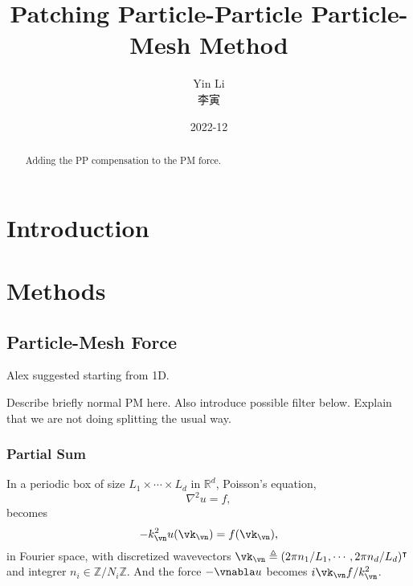 \documentclass[a4paper]{article}
\newcommand{\gkai}[1]{\begin{CJK*}{UTF8}{gkai}\raisebox{.1em}{(}#1\raisebox{.1em}{)}\end{CJK*}}
\newcommand{\YL}[1]{\textcolor{Bittersweet}{#1}}
\begin{document}
\title{Patching Particle-Particle Particle-Mesh Method}


\author{Yin Li \gkai{李寅}}


\date{2022-12}


\maketitle



\begin{abstract}
Adding the PP compensation to the PM force.
\end{abstract}



\section{Introduction}


\section{Methods}


\subsection{Particle-Mesh Force}


\YL{Alex suggested starting from 1D.}

\YL{Describe briefly normal PM here. Also introduce possible filter
below. Explain that we are not doing splitting the usual way.}


\subsubsection{Partial Sum}

In a periodic box of size $L_1 \times \cdots \times L_d$ in
$\mathbb{R}^d$, Poisson's equation,
%
\begin{equation}
\nabla^2 u = f,
\end{equation}
%
becomes
%
\begin{equation}
- k_\vn^2 u(\vk_\vn) = f(\vk_\vn),
\end{equation}
%
in Fourier space, with discretized wavevectors $\vk_\vn \triangleq (2\pi
n_1 / L_1, \cdots, 2\pi n_d / L_d )^\intercal$ and integrer $n_i \in
\mathbb{Z}/N_i\mathbb{Z}$.
And the force $- \vnabla u$ becomes $i \vk_\vn f / k_\vn^2$.
\end{document}
